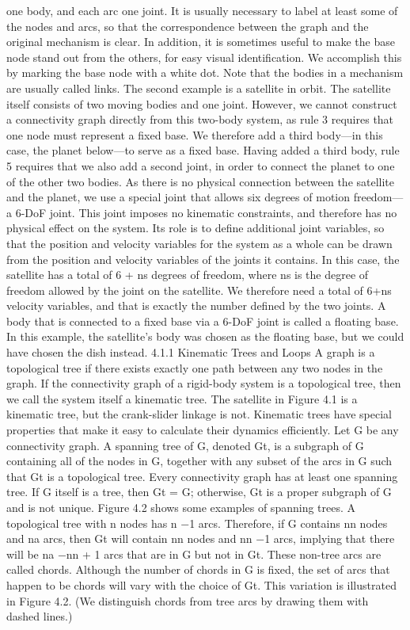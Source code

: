 one body, and each arc one joint. It is usually necessary to label at least some of the nodes and arcs, so that the correspondence between the graph and the original mechanism is clear. In addition, it is sometimes useful to make the base node stand out from the others, for easy visual identification. We accomplish this by marking the base node with a white dot. Note that the bodies in a mechanism are usually called links. The second example is a satellite in orbit. The satellite itself consists of two moving bodies and one joint. However, we cannot construct a connectivity graph directly from this two-body system, as rule 3 requires that one node must represent a fixed base. We therefore add a third body—in this case, the planet below—to serve as a fixed base. Having added a third body, rule 5 requires that we also add a second joint, in order to connect the planet to one of the other two bodies. As there is no physical connection between the satellite and the planet, we use a special joint that allows six degrees of motion freedom—a 6-DoF joint. This joint imposes no kinematic constraints, and therefore has no physical effect on the system. Its role is to define additional joint variables, so that the position and velocity variables for the system as a whole can be drawn from the position and velocity variables of the joints it contains. In this case, the satellite has a total of 6 + ns degrees of freedom, where ns is the degree of freedom allowed by the joint on the satellite. We therefore need a total of 6+ns velocity variables, and that is exactly the number defined by the two joints. A body that is connected to a fixed base via a 6-DoF joint is called a floating base. In this example, the satellite’s body was chosen as the floating base, but we could have chosen the dish instead. 4.1.1 Kinematic Trees and Loops A graph is a topological tree if there exists exactly one path between any two nodes in the graph. If the connectivity graph of a rigid-body system is a topological tree, then we call the system itself a kinematic tree. The satellite in Figure 4.1 is a kinematic tree, but the crank-slider linkage is not. Kinematic trees have special properties that make it easy to calculate their dynamics efficiently. Let G be any connectivity graph. A spanning tree of G, denoted Gt, is a subgraph of G containing all of the nodes in G, together with any subset of the arcs in G such that Gt is a topological tree. Every connectivity graph has at least one spanning tree. If G itself is a tree, then Gt = G; otherwise, Gt is a proper subgraph of G and is not unique. Figure 4.2 shows some examples of spanning trees. A topological tree with n nodes has n −1 arcs. Therefore, if G contains nn nodes and na arcs, then Gt will contain nn nodes and nn −1 arcs, implying that there will be na −nn + 1 arcs that are in G but not in Gt. These non-tree arcs are called chords. Although the number of chords in G is fixed, the set of arcs that happen to be chords will vary with the choice of Gt. This variation is illustrated in Figure 4.2. (We distinguish chords from tree arcs by drawing them with dashed lines.)

